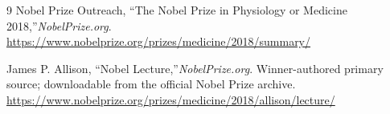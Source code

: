 \begin{thebibliography}{9}
Nobel Prize Outreach, ``The Nobel Prize in Physiology or Medicine 2018,''\emph{NobelPrize.org}.\\
\url{https://www.nobelprize.org/prizes/medicine/2018/summary/}

James P. Allison, ``Nobel Lecture,''\emph{NobelPrize.org}. Winner-authored primary source; downloadable from the official Nobel Prize archive.\\
\url{https://www.nobelprize.org/prizes/medicine/2018/allison/lecture/}
\end{thebibliography}

